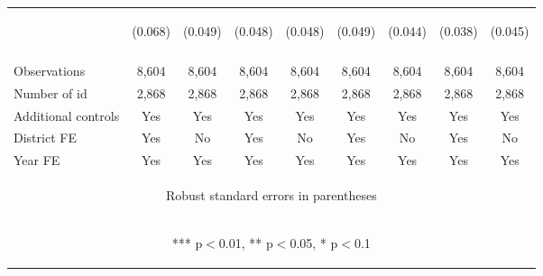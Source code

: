 \begin{center}
\begin{tabular}{lcccccccc}
 & \begin{footnotesize}(0.068)\end{footnotesize} & \begin{footnotesize}(0.049)\end{footnotesize} & \begin{footnotesize}(0.048)\end{footnotesize} & \begin{footnotesize}(0.048)\end{footnotesize} & \begin{footnotesize}(0.049)\end{footnotesize} & \begin{footnotesize}(0.044)\end{footnotesize} & \begin{footnotesize}(0.038)\end{footnotesize} & \begin{footnotesize}(0.045)\end{footnotesize} \\
\vspace{4pt} & \begin{footnotesize}\end{footnotesize} & \begin{footnotesize}\end{footnotesize} & \begin{footnotesize}\end{footnotesize} & \begin{footnotesize}\end{footnotesize} & \begin{footnotesize}\end{footnotesize} & \begin{footnotesize}\end{footnotesize} & \begin{footnotesize}\end{footnotesize} & \begin{footnotesize}\end{footnotesize} \\
Observations & 8,604 & 8,604 & 8,604 & 8,604 & 8,604 & 8,604 & 8,604 & 8,604 \\
Number of id & 2,868 & 2,868 & 2,868 & 2,868 & 2,868 & 2,868 & 2,868 & 2,868 \\
Additional controls & Yes & Yes & Yes & Yes & Yes & Yes & Yes & Yes \\
District FE & Yes & No & Yes & No & Yes & No & Yes & No \\
 Year FE & Yes & Yes & Yes & Yes & Yes & Yes & Yes & Yes \\ \hline
\multicolumn{9}{c}{\begin{footnotesize} Robust standard errors in parentheses\end{footnotesize}} \\
\multicolumn{9}{c}{\begin{footnotesize} *** p$<$0.01, ** p$<$0.05, * p$<$0.1\end{footnotesize}} \\
\end{tabular}
\end{center}
